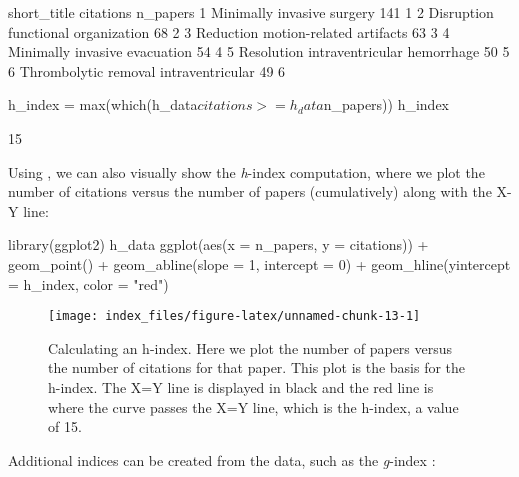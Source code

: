 \begin{Schunk}
\begin{Soutput}
                             short_title citations n_papers
1             Minimally invasive surgery       141        1
2     Disruption functional organization        68        2
3     Reduction motion-related artifacts        63        3
4          Minimally invasive evacuation        54        4
5 Resolution intraventricular hemorrhage        50        5
6  Thrombolytic removal intraventricular        49        6
\end{Soutput}
\begin{Sinput}
h_index = max(which(h_data$citations >= h_data$n_papers))
h_index
\end{Sinput}
\begin{Soutput}
[1] 15
\end{Soutput}
\end{Schunk}

Using  \citep{ggplot2}, we can also visually show the
\emph{h}-index computation, where we plot the number of citations versus
the number of papers (cumulatively) along with the X-Y line:

\begin{Schunk}
\begin{Sinput}
library(ggplot2)
h_data %>% 
  ggplot(aes(x = n_papers, y = citations)) + 
  geom_point() + geom_abline(slope = 1, intercept = 0) + 
  geom_hline(yintercept = h_index, color = "red")
\end{Sinput}
\begin{figure}
\texttt{[image: index\_files/figure-latex/unnamed-chunk-13-1]} \caption[Calculating an h-index]{Calculating an h-index.  Here we plot the number of papers versus the number of citations for that paper.  This plot is the basis for the h-index.  The X=Y line is displayed in black and the red line is where the curve passes the X=Y line, which is the h-index, a value of 15.}\label{fig:unnamed-chunk-13}
\end{figure}
\end{Schunk}

Additional indices can be created from the data, such as the
\emph{g}-index \citep{egghe2006theory}:

